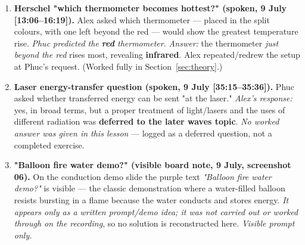\documentclass[11pt,a4paper]{article}
\newcommand{\ts}[1]{\textup{[#1]}}       %
\begin{document}
\begin{enumerate}[leftmargin=1.6em,itemsep=5pt,label=\textbf{F\arabic*.}]
\item \textbf{Herschel "which thermometer becomes hottest?" (spoken, 9 July \ts{13:06--16:19}).}
  Alex asked which thermometer --- placed in the split colours, with one left beyond the red
  --- would show the greatest temperature rise. \emph{Phuc predicted the \textbf{red}
  thermometer.} \emph{Answer:} the thermometer \emph{just beyond the red} rises most,
  revealing \textbf{infrared}. Alex repeated/redrew the setup at Phuc's request. (Worked
  fully in Section~\ref{sec:theory}.)

\item \textbf{Laser energy-transfer question (spoken, 9 July \ts{35:15--35:36}).} Phuc asked
  whether transferred energy can be sent "at the laser." \emph{Alex's response:} yes, in
  broad terms, but a proper treatment of light/lasers and the uses of different radiation was
  \textbf{deferred to the later waves topic}. \emph{No worked answer was given in this lesson}
  --- logged as a deferred question, not a completed exercise.

\item \textbf{"Balloon fire water demo?" (visible board note, 9 July, screenshot 06).} On the
  conduction demo slide the purple text \textit{"Balloon fire water demo?"} is visible ---
  the classic demonstration where a water-filled balloon resists bursting in a flame because
  the water conducts and stores energy. \emph{It appears only as a written prompt/demo idea;
  it was not carried out or worked through on the recording}, so no solution is reconstructed
  here. \emph{Visible prompt only.}


\end{enumerate}
\end{document}
